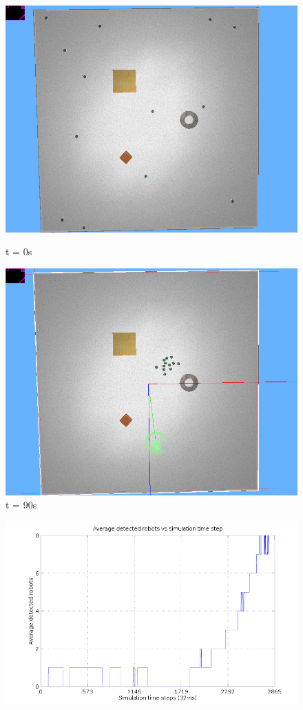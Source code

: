 \begin{figure}[!h]
	\centering
	\begin{minipage}{.5\textwidth}
		\centering
		\includegraphics[width=.75\linewidth]{scalable1}
		\caption*{t = 0s}
		\label{fig:scale1}
	\end{minipage}%
	\begin{minipage}{.5\textwidth}
		\centering
		\includegraphics[width=.75\linewidth]{scalable2}
		\caption*{t = 90s}
		\label{fig:scale2}
	\end{minipage}
	\label{fig:scale}
\end{figure}

\begin{figure}[h]
	\centering
	\begin{minipage}{1\textwidth}
		\centering
		\includegraphics[width=.75\linewidth]{data-scale1}
		\label{fig:exp5}
	\end{minipage}%
\end{figure}

